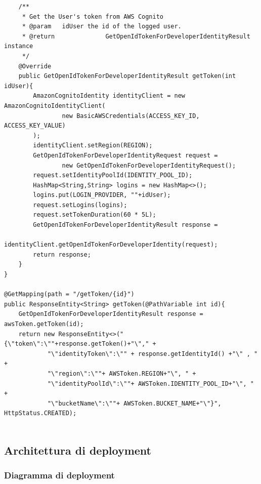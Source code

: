 \documentclass[12pt]{article}
\begin{document}
\begin{itemize}
\begin{lstlisting}
    /**
     * Get the User's token from AWS Cognito
     * @param	idUser the id of the logged user.
     * @return				GetOpenIdTokenForDeveloperIdentityResult instance
     */
    @Override
    public GetOpenIdTokenForDeveloperIdentityResult getToken(int idUser){
        AmazonCognitoIdentity identityClient = new AmazonCognitoIdentityClient(
                new BasicAWSCredentials(ACCESS_KEY_ID, ACCESS_KEY_VALUE)
        );
        identityClient.setRegion(REGION);
        GetOpenIdTokenForDeveloperIdentityRequest request =
                new GetOpenIdTokenForDeveloperIdentityRequest();
        request.setIdentityPoolId(IDENTITY_POOL_ID);
        HashMap<String,String> logins = new HashMap<>();
        logins.put(LOGIN_PROVIDER, ""+idUser);
        request.setLogins(logins);
        request.setTokenDuration(60 * 5L);
        GetOpenIdTokenForDeveloperIdentityResult response =
                identityClient.getOpenIdTokenForDeveloperIdentity(request);
        return response;
    }
}

@GetMapping(path = "/getToken/{id}")
public ResponseEntity<String> getToken(@PathVariable int id){
	GetOpenIdTokenForDeveloperIdentityResult response = awsToken.getToken(id);
	return new ResponseEntity<>("{\"token\":\""+response.getToken()+"\"," +
			"\"identityToken\":\"" + response.getIdentityId() +"\" , " +
			"\"region\":\""+ AWSToken.REGION+"\", " +
			"\"identityPoolId\":\""+ AWSToken.IDENTITY_POOL_ID+"\", " +
			"\"bucketName\":\""+ AWSToken.BUCKET_NAME+"\"}", HttpStatus.CREATED);
	
            \end{lstlisting}
             
             \end{itemize}
             
\subsection{Architettura di deployment}
\subsubsection{Diagramma di deployment}
\end{document}
